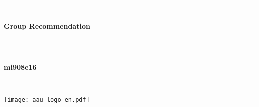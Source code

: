\begin{titlepage}

\newcommand{\HRule}{\rule{\linewidth}{0.5mm}} %
\center%




\HRule \\[0.4cm]
{ \Huge \bfseries Group Recommendation}\\[0.4cm] %
\HRule \\[1.5cm]

\vfill %

\begin{minipage}[t]{0.4\textwidth}
\begin{flushleft} \large
\textbf{mi908e16}\\
\groupmembersbyfirstname{}
\end{flushleft}
\end{minipage}
~%
\begin{minipage}[t][][b]{0.4\textwidth}
\begin{flushright}
\hfill
\texttt{[image: aau\_logo\_en.pdf]}
\end{flushright}
\end{minipage}\\

\endcenter{}

\end{titlepage}
